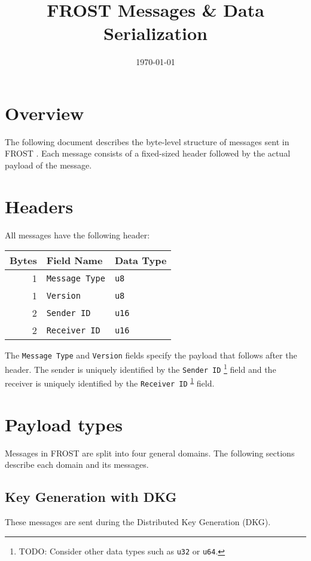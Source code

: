 \documentclass[11pt]{article}
\date{\today}
\title{FROST Messages \& Data Serialization}
\begin{document}
\maketitle
\tableofcontents


\section{Overview}
\label{sec:orgcc4f13d}
The following document describes the byte-level structure of messages sent in
FROST \cite{frost}. Each message consists of a fixed-sized header followed by the
actual payload of the message.

\section{Headers}
\label{sec:orgb4d292b}
All messages have the following header:

\begin{center}
\begin{tabular}{rll}
Bytes & Field Name & Data Type\\
\hline
1 & \texttt{Message Type} & \texttt{u8}\\
1 & \texttt{Version} & \texttt{u8}\\
2 & \texttt{Sender ID} & \texttt{u16}\\
2 & \texttt{Receiver ID} & \texttt{u16}\\
\end{tabular}
\end{center}

The \texttt{Message Type} and \texttt{Version} fields specify the payload that follows after
the header. The sender is uniquely identified by the \texttt{Sender ID} \footnote{TODO: Consider other data types such as \texttt{u32} or \texttt{u64}.\label{orgdd265d5}} field
and the receiver is uniquely identified by the \texttt{Receiver ID} \textsuperscript{\ref{orgdd265d5}} field.

\section{Payload types}
\label{sec:orgc8202e0}
Messages in FROST are split into four general domains. The following sections
describe each domain and its messages.

\subsection{Key Generation with DKG}
\label{sec:org1de0023}
These messages are sent during the Distributed Key Generation (DKG).
\end{document}
